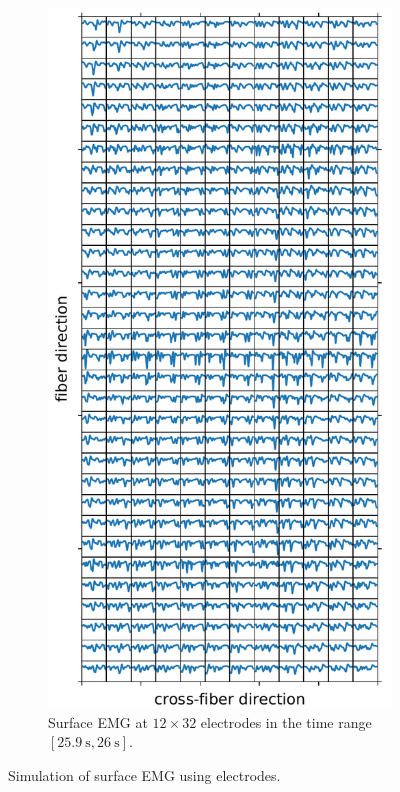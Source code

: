 \begin{figure}
\begin{subfigure}[t]{0.38\textwidth}
    \includegraphics[width=\textwidth]{images/results/application/emg_video_plot.pdf}%
    \caption{Surface EMG at $12 \times 32$ electrodes in the time range $[\SI{25.9}{\s},\SI{26}{\s}]$.}%
    \label{fig:emg_video_plot}%
  \end{subfigure}
  \caption{Simulation of surface EMG using electrodes.}%
  \label{fig:emg_video}%
\end{figure}
